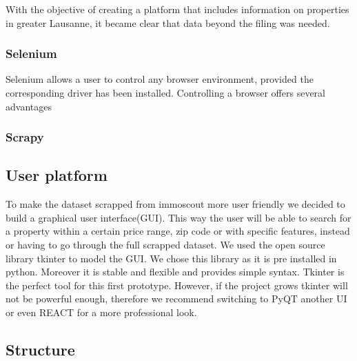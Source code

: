 \documentclass[main]{subfiles}
\begin{document}
With the objective of creating a platform that includes information on properties in greater Lausanne, 
it became clear that data beyond the filing was needed.


\subsubsection{Selenium}
Selenium allows a user to control any browser environment, provided the corresponding driver has been installed.
Controlling a browser offers several advantages 

\subsubsection{Scrapy}




\subsection{User platform}
To make the dataset scrapped from immoscout more user friendly we decided to build a graphical user interface(GUI).
This way the user will be able to search for a property within a certain price range, zip code or with specific features, 
instead or having to go through the full scrapped dataset.
We used the open source library tkinter to model the GUI. We chose this library as it is pre installed in python.
Moreover it is stable and flexible and provides simple syntax.
Tkinter is the perfect tool for this first prototype. However, if the project grows tkinter will not be powerful enough,
therefore we recommend switching to PyQT another UI or even REACT for a more professional look. 


\subsection{Structure}
\end{document}
